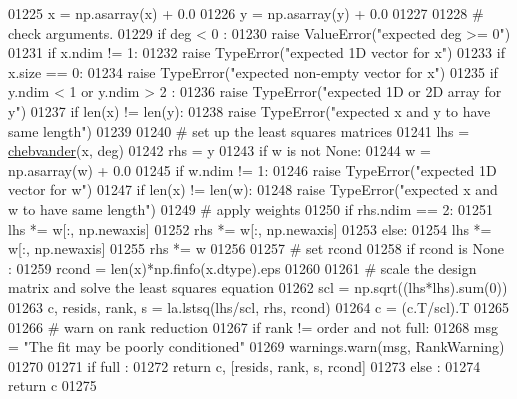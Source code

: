 \begin{DoxyCode}
01225     x = np.asarray(x) + 0.0
01226     y = np.asarray(y) + 0.0
01227 
01228     \textcolor{comment}{# check arguments.}
01229     \textcolor{keywordflow}{if} deg < 0 :
01230         \textcolor{keywordflow}{raise} ValueError(\textcolor{stringliteral}{"expected deg >= 0"})
01231     \textcolor{keywordflow}{if} x.ndim != 1:
01232         \textcolor{keywordflow}{raise} TypeError(\textcolor{stringliteral}{"expected 1D vector for x"})
01233     \textcolor{keywordflow}{if} x.size == 0:
01234         \textcolor{keywordflow}{raise} TypeError(\textcolor{stringliteral}{"expected non-empty vector for x"})
01235     \textcolor{keywordflow}{if} y.ndim < 1 \textcolor{keywordflow}{or} y.ndim > 2 :
01236         \textcolor{keywordflow}{raise} TypeError(\textcolor{stringliteral}{"expected 1D or 2D array for y"})
01237     \textcolor{keywordflow}{if} len(x) != len(y):
01238         \textcolor{keywordflow}{raise} TypeError(\textcolor{stringliteral}{"expected x and y to have same length"})
01239 
01240     \textcolor{comment}{# set up the least squares matrices}
01241     lhs = \hyperlink{namespacepyneb_1_1utils_1_1chebyshev_a4a53ad781fcf149c5ab6ae5d021b0950}{chebvander}(x, deg)
01242     rhs = y
01243     \textcolor{keywordflow}{if} w \textcolor{keywordflow}{is} \textcolor{keywordflow}{not} \textcolor{keywordtype}{None}:
01244         w = np.asarray(w) + 0.0
01245         \textcolor{keywordflow}{if} w.ndim != 1:
01246             \textcolor{keywordflow}{raise} TypeError(\textcolor{stringliteral}{"expected 1D vector for w"})
01247         \textcolor{keywordflow}{if} len(x) != len(w):
01248             \textcolor{keywordflow}{raise} TypeError(\textcolor{stringliteral}{"expected x and w to have same length"})
01249         \textcolor{comment}{# apply weights}
01250         \textcolor{keywordflow}{if} rhs.ndim == 2:
01251             lhs *= w[:, np.newaxis]
01252             rhs *= w[:, np.newaxis]
01253         \textcolor{keywordflow}{else}:
01254             lhs *= w[:, np.newaxis]
01255             rhs *= w
01256 
01257     \textcolor{comment}{# set rcond}
01258     \textcolor{keywordflow}{if} rcond \textcolor{keywordflow}{is} \textcolor{keywordtype}{None} :
01259         rcond = len(x)*np.finfo(x.dtype).eps
01260 
01261     \textcolor{comment}{# scale the design matrix and solve the least squares equation}
01262     scl = np.sqrt((lhs*lhs).sum(0))
01263     c, resids, rank, s = la.lstsq(lhs/scl, rhs, rcond)
01264     c = (c.T/scl).T
01265 
01266     \textcolor{comment}{# warn on rank reduction}
01267     \textcolor{keywordflow}{if} rank != order \textcolor{keywordflow}{and} \textcolor{keywordflow}{not} full:
01268         msg = \textcolor{stringliteral}{"The fit may be poorly conditioned"}
01269         warnings.warn(msg, RankWarning)
01270 
01271     \textcolor{keywordflow}{if} full :
01272         \textcolor{keywordflow}{return} c, [resids, rank, s, rcond]
01273     \textcolor{keywordflow}{else} :
01274         \textcolor{keywordflow}{return} c
01275 

\end{DoxyCode}
